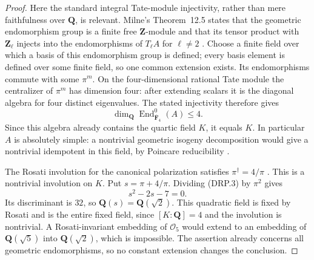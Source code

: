 \begin{proof}
Here the standard integral Tate-module injectivity, rather than mere
faithfulness over $\mathbf Q$, is relevant. Milne's
Theorem~12.5 states that the geometric endomorphism group is a finite
free $\mathbf Z$-module and that its tensor product with
$\mathbf Z_\ell$ injects into the endomorphisms of $T_\ell A$
for $\ell\ne2$ \cite[Theorem~12.5, pp.~21--22]{MilneAV}.
Choose a finite field over which a basis of this endomorphism group
is defined; every basis element is defined over some finite field,
so one common extension exists. Its endomorphisms commute with some
$\pi^m$. On the four-dimensional rational Tate module the
centralizer of $\pi^m$ has dimension four: after extending scalars
it is the diagonal algebra for four distinct eigenvalues. The stated
injectivity therefore gives
\[
 \dim_{\mathbf Q}\operatorname{End}^0_{\overline{\mathbf F}_4}(A)
       \le4.
\]
Since this algebra already contains the quartic field $K$, it equals
$K$. In particular $A$ is absolutely simple: a nontrivial geometric
isogeny decomposition would give a nontrivial idempotent in this
field, by Poincare reducibility
\cite[Proposition~12.1, p.~19]{MilneAV}.

The Rosati involution for the canonical polarization satisfies
$\pi^\dagger=4/\pi$ \cite[Lemma~19.2, p.~41]{MilneAV}.
This is a nontrivial involution on $K$. Put $s=\pi+4/\pi$.
Dividing (DRP.3) by $\pi^2$ gives
\[
                         s^2-2s-7=0.
 \tag{DRP.5}
\]
Its discriminant is $32$, so $\mathbf Q(s)=\mathbf Q(\sqrt2)$.
This quadratic field is fixed by Rosati and is the entire fixed
field, since $[K:\mathbf Q]=4$ and the involution is nontrivial.
A Rosati-invariant embedding of $\mathcal O_5$ would extend to an
embedding of $\mathbf Q(\sqrt5)$ into $\mathbf Q(\sqrt2)$,
which is impossible. The assertion already concerns all geometric
endomorphisms, so no constant extension changes the conclusion.
\end{proof}
